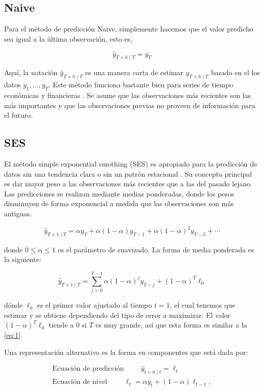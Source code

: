 \subsection{Naive}

Para el método de predicción Naive, simplemente hacemos que el valor predicho sea igual a la última observación, esto es,

\[ \hat{y}_{T+h \mid T}=y_{T} \]

Aquí, la notación $\hat{y}_{T+h \mid T}$ es una manera corta de estimar $y_{T+h \mid T}$ basado en el los datos $y_{1}, \ldots, y_{T}$. Este método funciona bastante bien para series de tiempo económicas y financieras \cite{hyndmanForecastingPrinciplesPractice}.
Se asume que las observaciones más recientes son las más importantes y que las observaciones previas no proveen de información para el futuro.

\subsection{SES}
El método simple exponential smothing (SES) es apropiado para la predicción de datos sin una tendencia clara o sin un patrón estacional \cite{hyndmanForecastingPrinciplesPractice}. Su concepto principal es dar mayor peso a las observaciones más recientes que a las del pasado lejano. Las predicciones se realizan mediante medias ponderadas, donde los pesos disminuyen de forma exponencial a medida que las observaciones son más antiguas.

\begin{equation}
	\hat{y}_{T+1 \mid T}=\alpha y_{T}+\alpha(1-\alpha) y_{T-1}+\alpha(1-\alpha)^{2} y_{T-2}+\cdots
	\label{eq:1}
\end{equation}

donde $0 \leq \alpha \leq 1$ es el parámetro de suavizado. La forma de media ponderada es la siguiente:

\[\hat{y}_{T+1 \mid T}=\sum_{j=0}^{T-1} \alpha(1-\alpha)^{j} y_{T-j}+(1-\alpha)^{T} \ell_{0}\]

dónde $\ell_{0}$ es el primer valor ajustado al tiempo $t=1$, el cual tenemos que estimar y se obtiene dependiendo del tipo de error a maximizar. El valor $(1-\alpha)^{T} \ell_{0}$ tiende a $0$ si $T$ es muy grande, así que esta forma es similar a la \autoref{eq:1}. 

Una representación alternativa es la forma en componentes que está dada por:

\begin{equation*}
	\begin{array}{lcl} 
		\textrm{Ecuación de predicción} \hspace{1cm} \hat{y}_{t+h \mid t}=\ell_{t}\\
		\textrm{Ecuación de nivel}\hspace{1cm} \ell_{t}=\alpha y_{t}+(1-\alpha) \ell_{t-1},
	\end{array} 
\end{equation*}

